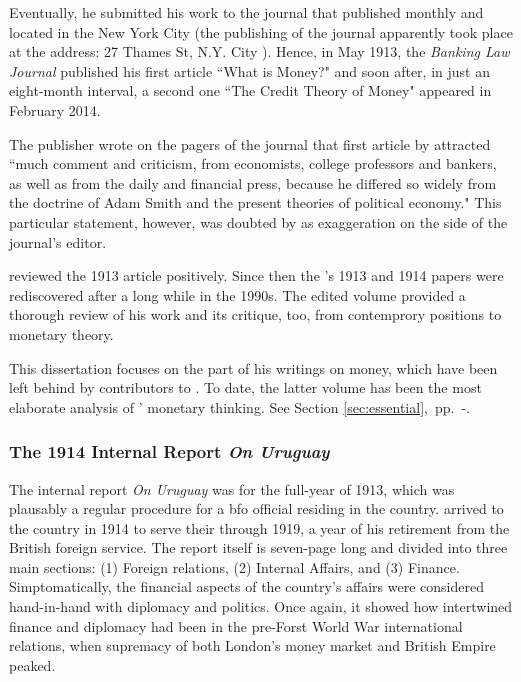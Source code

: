 Eventually, he submitted his work to the journal that published monthly and located in the New York City (the publishing of the journal apparently took place at the address: 27 Thames St, N.Y. City ). Hence, in May 1913, the \textit{Banking Law Journal} published his first article ``What is Money?" and soon after, in just an eight-month interval, a second one ``The Credit Theory of Money" appeared in February 2014.

The publisher wrote on the pagers of the journal that first article by \citeauthor{innes1913} attracted ``much comment and criticism, from economists, college professors and bankers, as well as from the daily and financial press, because he differed so widely from the doctrine of Adam Smith and the present theories of political economy." This particular statement, however, was doubted by \cite[p.~223]{wray2004_} as exaggeration on the side of the journal's editor.

\cite{keynes1914} reviewed the 1913 article positively. Since then the \citeauthor{innes1913}'s 1913 and 1914 papers were rediscovered after a long while in the 1990s. The edited volume \cite{wray2004} provided a thorough review of his work and its critique, too, from contemprory positions to monetary theory. 

This dissertation focuses on the part of his writings on money, which have been left behind by contributors to \cite{wray2004}. To date, the latter volume has been the most elaborate analysis of \citeauthor{innes1913}' monetary thinking. See Section \ref{sec:essential},~pp.~\pageref{sec:essential}-\pageref{sec:other_creditists}.

\subsubsection{The 1914 Internal Report \textit{On Uruguay}}\label{sec:uruguay}

The internal report \textit{On Uruguay} was for the full-year of 1913, which was plausably a regular procedure for a \ac{bfo} official residing in the country. \citeauthor{innes1914a} arrived to the country in 1914 to serve their through 1919, a year of his retirement from the British foreign service. The report itself is seven-page long and divided into three main sections: (1) Foreign relations, (2) Internal Affairs, and (3) Finance. Simptomatically, the financial aspects of the country's affairs were considered hand-in-hand with diplomacy and politics. Once again, it showed how intertwined finance and diplomacy had been in the pre-Forst World War international relations, when supremacy of both London's money market and British Empire peaked.   

